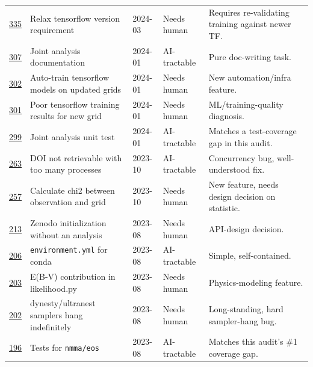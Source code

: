 \documentclass[10pt]{article}
\newcommand{\code}[1]{\texttt{#1}}
\begin{document}
\begin{longtable}{@{}p{0.9cm}p{5.1cm}p{1.2cm}p{2.3cm}p{5.6cm}@{}}
\href{https://github.com/nuclear-multimessenger-astronomy/nmma/issues/335}{335} & Relax tensorflow version requirement & 2024-03 & Needs human & Requires re-validating training against newer TF. \\[3pt]
\href{https://github.com/nuclear-multimessenger-astronomy/nmma/issues/307}{307} & Joint analysis documentation & 2024-01 & AI-tractable & Pure doc-writing task. \\[3pt]
\href{https://github.com/nuclear-multimessenger-astronomy/nmma/issues/302}{302} & Auto-train tensorflow models on updated grids & 2024-01 & Needs human & New automation/infra feature. \\[3pt]
\href{https://github.com/nuclear-multimessenger-astronomy/nmma/issues/301}{301} & Poor tensorflow training results for new grid & 2024-01 & Needs human & ML/training-quality diagnosis. \\[3pt]
\href{https://github.com/nuclear-multimessenger-astronomy/nmma/issues/299}{299} & Joint analysis unit test & 2024-01 & AI-tractable & Matches a test-coverage gap in this audit. \\[3pt]
\href{https://github.com/nuclear-multimessenger-astronomy/nmma/issues/263}{263} & DOI not retrievable with too many processes & 2023-10 & AI-tractable & Concurrency bug, well-understood fix. \\[3pt]
\href{https://github.com/nuclear-multimessenger-astronomy/nmma/issues/257}{257} & Calculate chi2 between observation and grid & 2023-10 & Needs human & New feature, needs design decision on statistic. \\[3pt]
\href{https://github.com/nuclear-multimessenger-astronomy/nmma/issues/213}{213} & Zenodo initialization without an analysis & 2023-08 & Needs human & API-design decision. \\[3pt]
\href{https://github.com/nuclear-multimessenger-astronomy/nmma/issues/206}{206} & \code{environment.yml} for conda & 2023-08 & AI-tractable & Simple, self-contained. \\[3pt]
\href{https://github.com/nuclear-multimessenger-astronomy/nmma/issues/203}{203} & E(B-V) contribution in likelihood.py & 2023-08 & Needs human & Physics-modeling feature. \\[3pt]
\href{https://github.com/nuclear-multimessenger-astronomy/nmma/issues/202}{202} & dynesty/ultranest samplers hang indefinitely & 2023-08 & Needs human & Long-standing, hard sampler-hang bug. \\[3pt]
\href{https://github.com/nuclear-multimessenger-astronomy/nmma/issues/196}{196} & Tests for \code{nmma/eos} & 2023-08 & AI-tractable & Matches this audit's \#1 coverage gap. \\[3pt]

\end{longtable}
\end{document}
